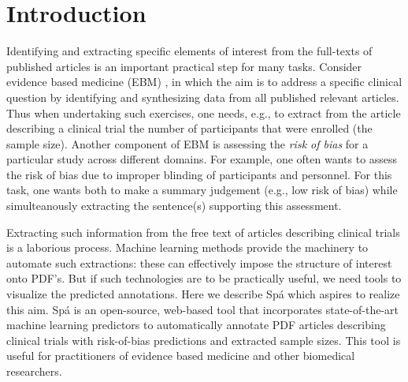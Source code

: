 \documentclass[runningheads,a4paper]{llncs}
\begin{document}
\section{Introduction}
\label{section:intro}


Identifying and extracting specific elements of interest from the full-texts of published articles is an important practical step for many tasks. Consider evidence based medicine (EBM) \cite{sackett1996}, in which the aim is to address a specific clinical question by identifying and synthesizing data from all published relevant articles. Thus when undertaking such exercises, one needs, e.g., to extract from the article describing a clinical trial the number of participants that were enrolled (the sample size). Another component of EBM is assessing the \emph{risk of bias} for a particular study across different domains. For example, one often wants to assess the risk of bias due to improper blinding of participants and personnel. For this task, one wants both to make a summary judgement (e.g., low risk of bias) while simulteanously extracting the sentence(s) supporting this assessment.


Extracting such information from the free text of articles describing clinical trials is a laborious process. Machine learning methods provide the machinery to automate such extractions: these can effectively impose the structure of interest onto PDF's. But if such technologies are to be practically useful, we need tools to visualize the predicted annotations. Here we describe {Sp\'a} which aspires to realize this aim. {Sp\'a} is an open-source, web-based tool that incorporates state-of-the-art machine learning predictors to automatically annotate PDF articles describing clinical trials with risk-of-bias predictions and extracted sample sizes. This tool is useful for practitioners of evidence based medicine and other biomedical researchers. 
\end{document}
